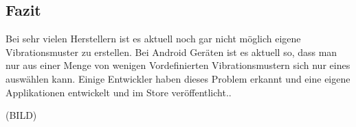 \subsection{Fazit}
\label{ch:Grundlagen:sec:RelatedWork:subsec:PersonalisierteSmartwatch}
Bei sehr vielen Herstellern ist es aktuell noch gar nicht m{\"o}glich eigene Vibrationsmuster zu erstellen. Bei Android Ger{\"a}ten ist es aktuell so, dass man nur aus einer Menge von wenigen Vordefinierten Vibrationsmustern sich nur eines ausw{\"a}hlen kann. Einige Entwickler haben dieses Problem erkannt und eine eigene Applikationen entwickelt und im Store ver{\"o}ffentlicht..

(BILD)
